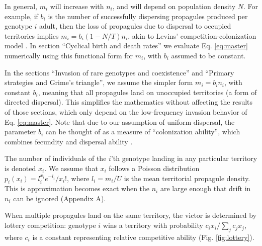 \documentclass[11pt]{article}
\begin{document}
In general, $m_i$ will increase with $n_i$, and will depend on population density $N$. For example, if $b_i$ is the number of successfully dispersing propagules produced per genotype $i$ adult, then the loss of propagules due to dispersal to occupied territories implies $m_i=b_i(1-N/T)n_i$, akin to Levins' competition-colonization model \citep{levins_71,tilman_94}. In section ``Cyclical birth and death rates'' we evaluate Eq. \eqref{eq:master} numerically using this functional form for $m_i$, with $b_i$ assumed to be constant. 

In the sections ``Invasion of rare genotypes and coexistence'' and ``Primary strategies and Grime's triangle'', we assume the simpler form $m_i=b_i n_i$, with constant $b_i$, meaning that all propagules land on unoccupied territories (a form of directed dispersal). This simplifies the mathematics without affecting the results of those sections, which only depend on the low-frequency invasion behavior of Eq. \eqref{eq:master}. Note that due to our assumption of uniform dispersal, the parameter $b_i$ can be thought of as a measure of ``colonization ability'', which combines fecundity and dispersal ability \citep{levins_71,tilman_94,bolker_99}. 

The number of individuals of the $i$'th genotype landing in any particular territory is denoted $x_i$. We assume that $x_i$ follows a Poisson distribution $p_i(x_i)=l_i^{x_i} e^{-l_i}/x_i!$, where $l_i=m_i/U$ is the mean territorial propagule density. This is approximation becomes exact when the $n_i$ are large enough that drift in $n_i$ can be ignored (Appendix A).

When multiple propagules land on the same territory, the victor is determined by lottery competition: genotype $i$ wins a territory with probability $c_i x_i/\sum_j c_j x_j$, where $c_i$ is a constant representing relative competitive ability (Fig. \ref{fig:lottery}). 
\end{document}

